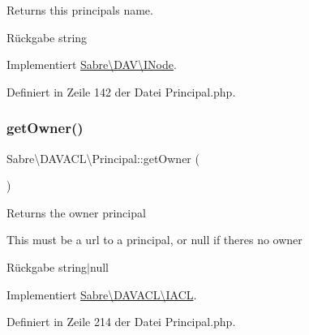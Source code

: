 Returns this principals name.

\begin{DoxyReturn}{Rückgabe}
string 
\end{DoxyReturn}


Implementiert \mbox{\hyperlink{interface_sabre_1_1_d_a_v_1_1_i_node_ab616fe836b1ae36af12126a2bc934dce}{Sabre\textbackslash{}\+D\+A\+V\textbackslash{}\+I\+Node}}.



Definiert in Zeile 142 der Datei Principal.\+php.

\mbox{\label{class_sabre_1_1_d_a_v_a_c_l_1_1_principal_a9b250620ece0dd4a7d13eb2589b44222}} 
\subsubsection{\texorpdfstring{get\+Owner()}{getOwner()}}
{\footnotesize\ttfamily Sabre\textbackslash{}\+D\+A\+V\+A\+C\+L\textbackslash{}\+Principal\+::get\+Owner (\begin{DoxyParamCaption}{ }\end{DoxyParamCaption})}

Returns the owner principal

This must be a url to a principal, or null if there\textquotesingle{}s no owner

\begin{DoxyReturn}{Rückgabe}
string$\vert$null 
\end{DoxyReturn}


Implementiert \mbox{\hyperlink{interface_sabre_1_1_d_a_v_a_c_l_1_1_i_a_c_l_a05f531b4ae1a86eab4e6e95b0413390e}{Sabre\textbackslash{}\+D\+A\+V\+A\+C\+L\textbackslash{}\+I\+A\+CL}}.



Definiert in Zeile 214 der Datei Principal.\+php.

\mbox{\label{class_sabre_1_1_d_a_v_a_c_l_1_1_principal_ab423bb78114f5948783b5b1832f163e7}} 
